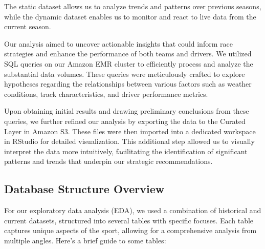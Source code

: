 \documentclass{article}
\begin{document}
The static dataset allows us to analyze trends and patterns over previous seasons, while the dynamic dataset enables us to monitor and react to live data from the current season.

Our analysis aimed to uncover actionable insights that could inform race strategies and enhance the performance of both teams and drivers. We utilized SQL queries on our Amazon EMR cluster to efficiently process and analyze the substantial data volumes. These queries were meticulously crafted to explore hypotheses regarding the relationships between various factors such as weather conditions, track characteristics, and driver performance metrics.

Upon obtaining initial results and drawing preliminary conclusions from these queries, we further refined our analysis by exporting the data to the Curated Layer in Amazon S3. These files were then imported into a dedicated workspace in RStudio for detailed visualization. This additional step allowed us to visually interpret the data more intuitively, facilitating the identification of significant patterns and trends that underpin our strategic recommendations.

\subsection{Database Structure Overview}
For our exploratory data analysis (EDA), we used a combination of historical and current datasets, structured into several tables with specific focuses. Each table captures unique aspects of the sport, allowing for a comprehensive analysis from multiple angles. Here's a brief guide to some tables:
\end{document}
